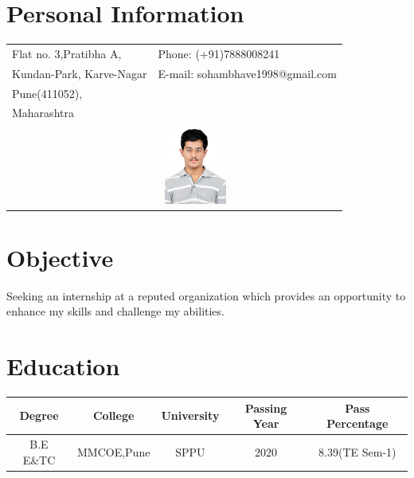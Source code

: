 \documentclass[margin,line]{res}
\begin{document}

\begin{resume}
\section{\sc Personal Information}


\begin{tabular}{@{}p{3.5in}p{3in}}
Flat no. 3,Pratibha A,              & {Phone:}  (+91)7888008241 \\
Kundan-Park, Karve-Nagar
 & {E-mail:} sohambhave1998@gmail.com\\
Pune(411052), \\
Maharashtra   \\
& \centering\includegraphics[width=2.5cm, height=2.6cm]{SohamBhave.jpg} \\
\end{tabular}

\section{\sc Objective}

Seeking an internship at a reputed organization which provides an opportunity to enhance my skills and challenge my abilities.

\section{\sc Education}
\begin{tabular}{ |c|c|c|c|c| } 
 \hline
 Degree & College & University & Passing Year & Pass Percentage \\ 
\hline 
B.E  E\&TC & MMCOE,Pune & SPPU & 2020 & 8.39(TE Sem-1) \\  
 \hline
\end{tabular}


\end{resume}
\end{document}
